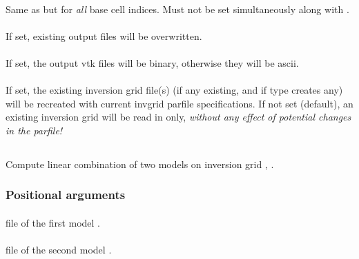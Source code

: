 \paragraph{}
Same as  but for \emph{all} base cell indices. Must not be set simultaneously along with .
\paragraph{}
If set, existing output files will be overwritten.
\paragraph{}
If set, the output vtk files will be binary, otherwise they will be ascii.
\paragraph{}
If set, the existing inversion grid file(s) (if any existing, and if type creates any) will be recreated with 
current invgrid parfile specifications. If not set (default), an existing inversion grid will be read in only, 
\emph{without any effect of potential changes in the parfile!}
%
\subsection{} \label{programs_scripts,sec:bin_prog,sec:combine_inverted_models}
Compute linear combination      of two models on inversion grid
, .
\subsubsection{Positional arguments}
\paragraph{}
 file of the first model .
\paragraph{}
 file of the second model .
